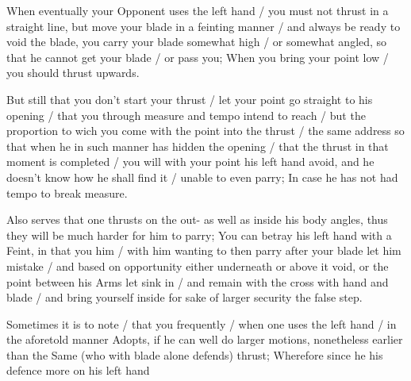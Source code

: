 When eventually your Opponent uses the left hand / you must not thrust
in a straight line, but move your blade in a feinting manner / and
always be ready to void the blade, you carry your blade somewhat high
/ or somewhat angled, so that he cannot get your blade / or pass you;
When you bring your point low / you should thrust upwards.


But still that you don't start your thrust / let your point go straight to
his opening / that you through measure and tempo intend to reach /
but the proportion to wich you come with the point into the thrust /
the same address so that when he in such manner has hidden the opening
/ that the thrust in that moment is completed / you will with your
point his left hand avoid, and he doesn't know how he shall find it / unable to
even parry; In case he has not had tempo to break measure.


Also serves that one thrusts on the out- as well as inside his body
angles, thus they will be much harder for him to parry; You can betray
his left hand with a Feint, in that you him / with him wanting to
then parry after your blade let him mistake / and based on opportunity
either underneath or above it void, or the point between his Arms let
sink in / and remain with the cross with hand and blade / and bring
yourself inside for sake of larger security the false step.


Sometimes it is to note / that you frequently / when one uses the left
hand / in the aforetold manner Adopts, if he can well do larger
motions, nonetheless earlier than the Same (who with blade alone
defends) thrust; Wherefore since he his defence more on his left hand
